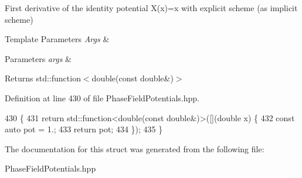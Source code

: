 First derivative of the identity potential X(x)=x with explicit scheme (as implicit scheme) 


\begin{DoxyTemplParams}{Template Parameters}
{\em Args} & \\
\hline
\end{DoxyTemplParams}

\begin{DoxyParams}{Parameters}
{\em args} & \\
\hline
\end{DoxyParams}
\begin{DoxyReturn}{Returns}
std\+::function$<$double(const double\&)$>$ 
\end{DoxyReturn}


Definition at line 430 of file Phase\+Field\+Potentials.\+hpp.


\begin{DoxyCode}
430                                                         \{
431     \textcolor{keywordflow}{return} std::function<double(const double&)>([](\textcolor{keywordtype}{double} x) \{
432       \textcolor{keyword}{const} \textcolor{keyword}{auto} pot = 1.;
433       \textcolor{keywordflow}{return} pot;
434     \});
435   \}
\end{DoxyCode}


The documentation for this struct was generated from the following file\+:\begin{DoxyCompactItemize}
\item 
Phase\+Field\+Potentials.\+hpp\end{DoxyCompactItemize}

